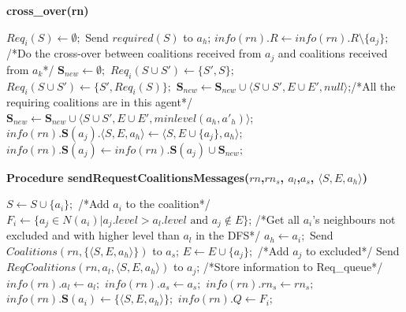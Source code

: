 \documentclass{article}
\begin{document}
\begin{algorithm}[!tb]
\caption{\textbf{cross\_over(rn)}}
\begin{algorithmic}
		\STATE $Req_i(S) \leftarrow \emptyset;$
		\STATE Send $required(S)$ to $a_h$;
	\ENDFOR
\ENDIF
{}
\STATE $info(rn).R \leftarrow info(rn).R
\setminus \{a_j\};$
		\STATE /*Do the cross-over between coalitions received from $a_j$ and
		coalitions received from $a_k$*/
		\STATE $\mathbf{S}_{new} \leftarrow \emptyset;$
					\STATE $Req_i(S\cup S')\leftarrow \{S',S\};$
				\ELSE
					\STATE $Req_i(S\cup S')\leftarrow \{S',Req_i(S)\};$
			 	\ENDIF
			 	\STATE $\mathbf{S}_{new} \leftarrow \mathbf{S}_{new} \cup \langle S\cup S',
			E\cup E', null\rangle$;/*All the requiring coalitions are in this agent*/
			\ELSE
				\STATE $\mathbf{S}_{new} \leftarrow \mathbf{S}_{new} \cup \langle S\cup S',
			E\cup E', minlevel(a_h,a'_h)\rangle$;
			\ENDIF
		\ENDIF
		\ENDFOR
		\STATE $info(rn).\mathbf{S}(a_j).\langle S, E, a_h\rangle \leftarrow \langle
		S, E \cup \{a_j\}, a_h\rangle;$ \STATE $info(rn).\mathbf{S}(a_j)\leftarrow
		info(rn).\mathbf{S}(a_j) \cup \mathbf{S}_{new};$
		\ENDFOR
\ENDFOR
\ENDFOR
\end{algorithmic}
\end{algorithm}


 \begin{algorithm}[!tb]
\caption{\textbf{Procedure
sendRequestCoalitionsMessages($rn$,$rn_s$, $a_l$,$a_s$, $\langle S, E, a_h
\rangle$)}}
\begin{algorithmic}
\STATE $S\leftarrow S \cup \{a_i\};$ /*Add
$a_i$ to the coalition*/
\STATE $F_i \leftarrow \{ a_j \in N(a_i) \vert a_j.level > a_l.level
\mbox{ and } a_j \not\in E \}$; /*Get all $a_i$'s neighbours not excluded and with higher
level than $a_l$ in the DFS*/
\STATE $a_h \leftarrow a_i;$
\ENDIF
{}
	\STATE Send $Coalitions(rn, \{\langle S, E, a_h\rangle\})$ to $a_s$;
\ELSE
		\STATE $E \leftarrow E \cup \{a_j\};$ /*Add $a_j$ to excluded*/
		\STATE Send $ReqCoalitions(rn,a_l,\langle S,E, a_h \rangle)$ to $a_j$;
	\ENDFOR
	\STATE /*Store information to Req\_queue*/
    \STATE $info(rn).a_l \leftarrow a_l;$
    \STATE $info(rn).a_s \leftarrow a_s;$
    \STATE $info(rn).rn_s \leftarrow rn_s;$
    \STATE $info(rn).\mathbf{S}(a_i) \leftarrow \{\langle S,
E, a_h\rangle \};$
    \STATE $info(rn).Q \leftarrow F_i;$
\ENDIF
\end{algorithmic}
\end{algorithm}
\end{document}
